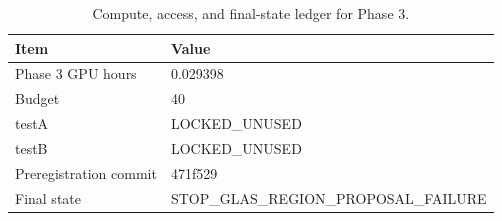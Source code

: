 \begin{table}[t]
\centering
\small
\caption{Compute, access, and final-state ledger for Phase 3.}
\label{tab:compute_access}
\begin{tabular}{ll}
\hline
Item & Value \\
\hline
Phase 3 GPU hours & 0.029398 \\
Budget & 40 \\
testA & LOCKED\_UNUSED \\
testB & LOCKED\_UNUSED \\
Preregistration commit & 471f529 \\
Final state & STOP\_GLAS\_REGION\_PROPOSAL\_FAILURE \\
\hline
\end{tabular}
\end{table}
